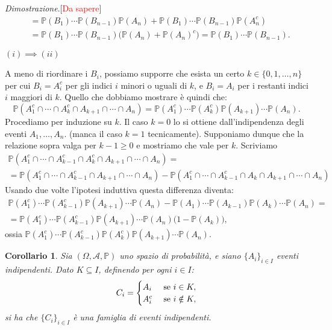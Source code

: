 \documentclass[11pt]{book}
\makeatletter
\theoremstyle{Definizione}
\theoremstyle{TeoremaProposizioneLemmaCorollario}
\newtheorem{mycor}[myteo]{Corollario}
\theoremstyle{OsservazioneNota}
\renewenvironment{proof}[1][\proofname]{\par
  \normalfont \topsep6\p@\@plus6\p@\relax
  \trivlist
  \item[\hskip\labelsep
        \itshape
    #1\@addpunct{.}]\ignorespaces
}{%
  \endtrivlist\@endpefalse
}
\renewcommand{\P}{\mathbb{P}}
\renewenvironment{proof}{\textsl{Dimostrazione}.}{}
\makeatother
\begin{document}
\begin{boxpro}
\begin{proof}[\textcolor{red}{Da sapere}]
\begin{align*}
&= \P(B_1)\cdots\P(B_{n-1})\P(A_n) + \P(B_1)\cdots \P(B_{n-1})\P(A_n^c)\\
&= \P(B_1)\cdots\P(B_{n-1})\big(\P(A_n)+\P(A_n)^c\big) = \P(B_1)\cdots\P(B_{n-1}).
\end{align*}
\begin{flushleft}
$(i) \implies (ii)$
\end{flushleft}
A meno di riordinare i $B_i$, possiamo supporre che esista un certo $k\in \{0,1,\dots,n\}$ per cui $B_i = A_i^c$ per gli indici $i$ minori o uguali di $k$, e $B_i = A_i$ per i restanti indici $i$ maggiori di $k$. Quello che dobbiamo mostrare è quindi che:
$$
\P(A_1^c \cap \cdots \cap A_k^c \cap A_{k+1} \cap \cdots \cap A_n) = \P(A_1^c)\cdots\P(A_k^c)\P(A_{k+1})\cdots\P(A_n).
$$
Procediamo per induzione su $k$. Il caso $k = 0$ lo si ottiene dall'indipendenza degli eventi $A_1,\dots,A_n$. (manca il caso $k = 1$ tecnicamente). Supponiamo dunque che la relazione sopra valga per $k-1 \geq 0$ e mostriamo che vale per $k$. Scriviamo
\begin{multline*}
\P(A_1^c \cap \cdots \cap A_{k-1}^c\cap A_k^c\cap A_{k+1}\cap \cdots \cap A_n) = \\
 = \P(A_1^c \cap \cdots \cap A_{k-1}^c\cap A_{k+1}\cap \cdots \cap A_n)-\P(A_1^c \cap \cdots \cap A_{k-1}^c\cap A_k \cap A_{k+1}\cap \cdots \cap A_n)
\end{multline*}
Usando due volte l'ipotesi induttiva questa differenza diventa:
\begin{multline*}
\P(A_1^c)\cdots \P(A_{k-1}^c)\P(A_{k+1})\cdots\P(A_n) - \P(A_1)\cdots\P(A_{k-1})\P(A_k)\cdots\P(A_n)=\\
= \P(A_1^c)\cdots\P(A_{k-1}^c)\P(A_{k+1})\cdots\P(A_n)\big(1-\P(A_k)\big),
\end{multline*}
ossia $\P(A_1^c)\cdots\P(A_{k-1}^c)\P(A_k^c)\P(A_{k+1})\cdots\P(A_n)$.
\end{proof}
\end{boxpro}
\begin{boxoss}
\begin{mycor}\label{Cor:CorollarioIndipendenzaDopoProposizioneEquivalenza}
Sia $(\Omega,\mathcal{A},\P)$ uno spazio di probabilità, e siano $\{A_i\}_{i\in I}$ eventi indipendenti. Dato $K\subseteq I$, definendo per ogni $i\in I$:
$$
C_i = \begin{cases}
A_i &\textup{ se }i\in K,\\
A_i^c &\textup{ se }i\notin K,
\end{cases}
$$
si ha che $\{C_i\}_{i\in I}$ è una famiglia di eventi indipendenti.
\end{mycor}
\end{boxoss}
\end{document}
